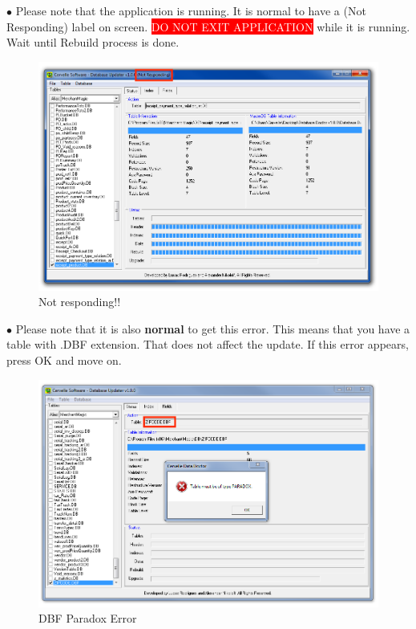 \documentclass[a4paper, 11pt]{article}
\begin{document}
\pagebreak

\vspace*{\fill}
$\bullet$ Please note that the application is running. It is normal to have a (Not Responding) label on screen. \colorbox{Red}{\textcolor{White}{DO NOT EXIT APPLICATION}} while it is running. Wait until Rebuild process is done. 
\begin{figure}[h]
    \centering
     \includegraphics[width=\textwidth]{capture 27}
    \caption{Not responding!! }
\end{figure}
\vspace*{\fill}

\pagebreak

\vspace*{\fill}
$\bullet$ Please note that it is also \textbf{normal}  to get this error. This means that you have a table with .DBF extension. That does not affect the update. If this error appears, press OK and move on.
\begin{figure}[h]
    \centering
     \includegraphics[width=\textwidth]{capture 28}
    \caption{DBF Paradox Error}
\end{figure}
\vspace*{\fill}
\end{document}
